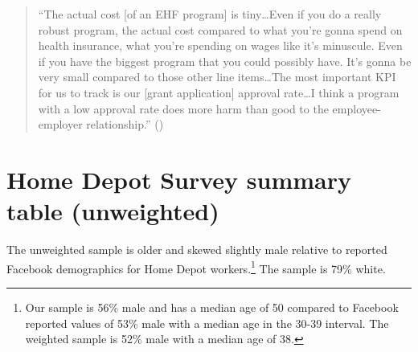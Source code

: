\documentclass[
  11pt,
  oneside]{article}
\begin{document}
\begin{quote}
``The actual cost {[}of an EHF program{]} is tiny\ldots Even if you do a really robust program, the actual cost compared to what you're gonna spend on health insurance, what you're spending on wages like it's minuscule. Even if you have the biggest program that you could possibly have. It's gonna be very small compared to those other line items\ldots The most important KPI for us to track is our {[}grant application{]} approval rate\ldots I think a program with a low approval rate does more harm than good to the employee-employer relationship.'' ()
\end{quote}

\section{Home Depot Survey summary table (unweighted)}\label{app-survsum-uw}

The unweighted sample is older and skewed slightly male relative to reported Facebook demographics for Home Depot workers.\footnote{Our sample is 56\% male and has a median age of 50 compared to Facebook reported values of 53\% male with a median age in the 30-39 interval. The weighted sample is 52\% male with a median age of 38.} The sample is 79\% white.
\end{document}
